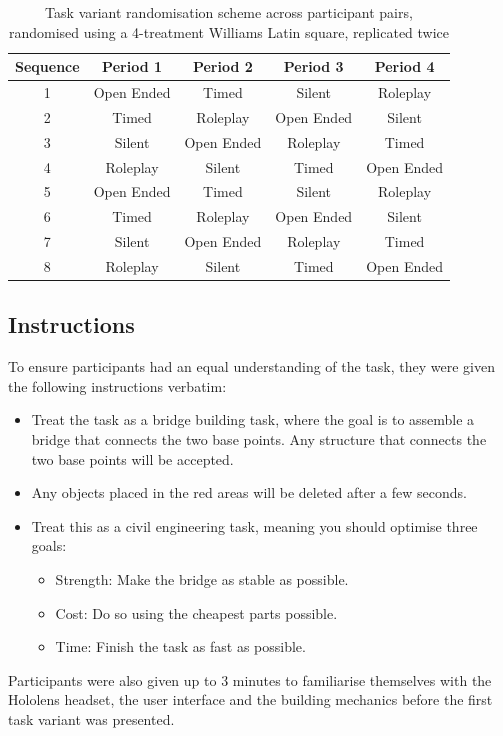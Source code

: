 \begin{table}[ht]
    \centering
    \begin{tabular}{c|cccc}
      Sequence & Period 1    & Period 2    & Period 3      & Period 4      \\
      \hline
      1        & Open Ended  & Timed       & Silent        & Roleplay      \\
      2        & Timed       & Roleplay    & Open Ended    & Silent        \\
      3        & Silent      & Open Ended  & Roleplay      & Timed         \\
      4        & Roleplay    & Silent      & Timed         & Open Ended    \\
      5        & Open Ended  & Timed       & Silent        & Roleplay      \\
      6        & Timed       & Roleplay    & Open Ended    & Silent        \\
      7        & Silent      & Open Ended  & Roleplay      & Timed         \\
      8        & Roleplay    & Silent      & Timed         & Open Ended    \\
    \end{tabular}
    \caption{Task variant randomisation scheme across participant pairs, randomised using a 4-treatment Williams Latin square, replicated twice\cite{williams1949experimental}}
    \label{tab:latin-square}
\end{table}

\subsection{Instructions}\label{subsec:task-instructions}
To ensure participants had an equal understanding of the task, they were given the following instructions verbatim:

\begin{itemize}
    \item Treat the task as a bridge building task, where the goal is to assemble a bridge that connects the two base points. Any structure that connects the two base points will be accepted.
    \item Any objects placed in the red areas will be deleted after a few seconds.
    \item Treat this as a civil engineering task, meaning you should optimise three goals:
    \begin{itemize}
        \item Strength: Make the bridge as stable as possible.
        \item Cost: Do so using the cheapest parts possible.
        \item Time: Finish the task as fast as possible.
    \end{itemize}
\end{itemize}
Participants were also given up to 3 minutes to familiarise themselves with the Hololens headset, the user interface and the building mechanics before the first task variant was presented.


